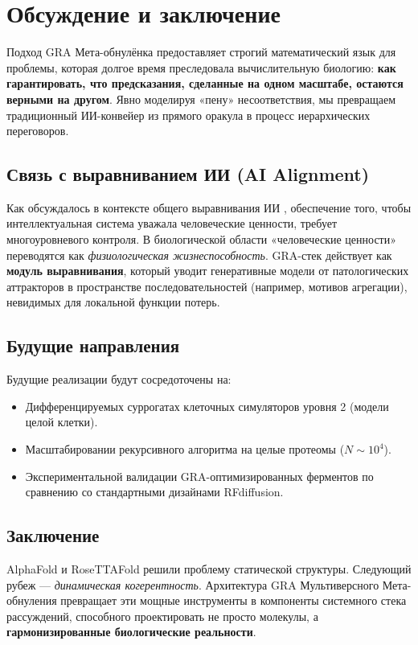 \documentclass[11pt]{article}
\begin{document}
\section{Обсуждение и заключение}

Подход GRA Мета-обнулёнка предоставляет строгий математический язык для проблемы, которая долгое время преследовала вычислительную биологию: \textbf{как гарантировать, что предсказания, сделанные на одном масштабе, остаются верными на другом}. Явно моделируя «пену» несоответствия, мы превращаем традиционный ИИ-конвейер из прямого оракула в процесс иерархических переговоров.

\subsection{Связь с выравниванием ИИ (AI Alignment)}
Как обсуждалось в контексте общего выравнивания ИИ \cite{harvard_align_2026}, обеспечение того, чтобы интеллектуальная система уважала человеческие ценности, требует многоуровневого контроля. В биологической области «человеческие ценности» переводятся как \emph{физиологическая жизнеспособность}. GRA-стек действует как \textbf{модуль выравнивания}, который уводит генеративные модели от патологических аттракторов в пространстве последовательностей (например, мотивов агрегации), невидимых для локальной функции потерь.

\subsection{Будущие направления}
Будущие реализации будут сосредоточены на:
\begin{itemize}
    \item Дифференцируемых суррогатах клеточных симуляторов уровня 2 (модели целой клетки).
    \item Масштабировании рекурсивного алгоритма на целые протеомы (\(N \sim 10^4\)).
    \item Экспериментальной валидации GRA-оптимизированных ферментов по сравнению со стандартными дизайнами RFdiffusion.
\end{itemize}

\subsection*{Заключение}
AlphaFold и RoseTTAFold решили проблему статической структуры. Следующий рубеж — \emph{динамическая когерентность}. Архитектура GRA Мультиверсного Мета-обнуления превращает эти мощные инструменты в компоненты системного стека рассуждений, способного проектировать не просто молекулы, а \textbf{гармонизированные биологические реальности}.
\end{document}
